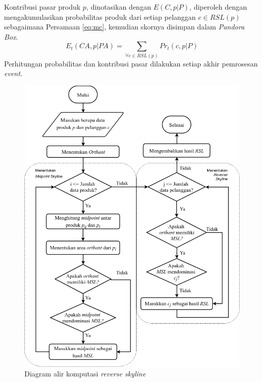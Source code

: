
Kontribusi pasar produk $p$, dinotasikan dengan $E(C, p|P)$, diperoleh dengan mengakumulasikan probabilitas produk dari setiap pelanggan $c \in RSL(p)$ sebagaimana Persamaan \ref{eq:mc}, kemudian skornya disimpan dalam \textit{Pandora Box}.
\begin{equation}\label{eq:mc}
E_t(CA, p|PA) = \sum_{\forall c \in RSL(p)} Pr_t(c, p|P)
\end{equation}
Perhitungan probabilitas dan kontribusi pasar dilakukan setiap akhir pemrosesan \textit{event}.

\begin{figure}[H]
	\centering
	\includegraphics[width=11.5cm]{assets/img/bab3/flowchart-rsl.png}
	\caption{Diagram alir komputasi \textit{reverse skyline}}
	\label{fig:flowchart-rsl}
\end{figure}

